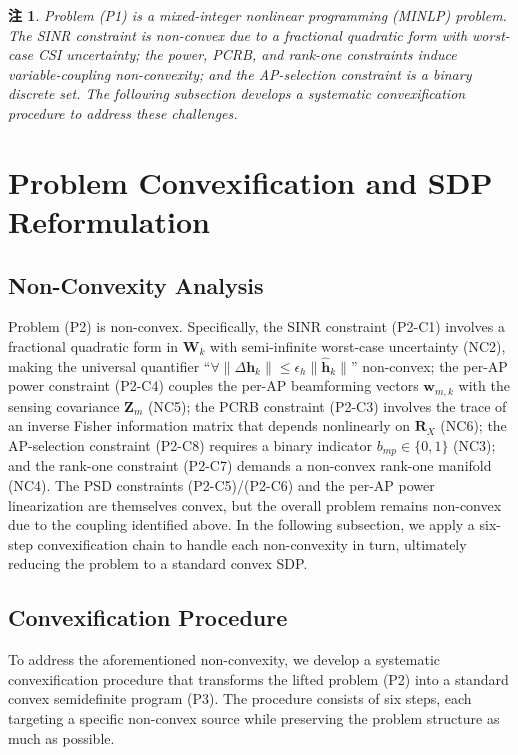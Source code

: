 \documentclass[12pt,a4paper]{article}
\newtheorem{remark}{注}
\newcommand{\vect}[1]{\mathbf{#1}}
\newcommand{\mat}[1]{\mathbf{#1}}
\begin{document}
\begin{remark}
Problem (P1) is a mixed-integer nonlinear programming (MINLP) problem. The SINR constraint is non-convex due to a fractional quadratic form with worst-case CSI uncertainty; the power, PCRB, and rank-one constraints induce variable-coupling non-convexity; and the AP-selection constraint is a binary discrete set. The following subsection develops a systematic convexification procedure to address these challenges.
\end{remark}
\section{Problem Convexification and SDP Reformulation}

\subsection{Non-Convexity Analysis}

Problem (P2) is non-convex. Specifically, the SINR constraint (P2-C1) involves a fractional quadratic form in $\mat{W}_k$ with semi-infinite worst-case uncertainty (NC2), making the universal quantifier ``$\forall \|\Delta\vect{h}_k\| \leq \epsilon_h \|\hat{\vect{h}}_k\|$'' non-convex; the per-AP power constraint (P2-C4) couples the per-AP beamforming vectors $\vect{w}_{m,k}$ with the sensing covariance $\mat{Z}_m$ (NC5); the PCRB constraint (P2-C3) involves the trace of an inverse Fisher information matrix that depends nonlinearly on $\mat{R}_X$ (NC6); the AP-selection constraint (P2-C8) requires a binary indicator $b_{mp} \in \{0,1\}$ (NC3); and the rank-one constraint (P2-C7) demands a non-convex rank-one manifold (NC4). The PSD constraints (P2-C5)/(P2-C6) and the per-AP power linearization are themselves convex, but the overall problem remains non-convex due to the coupling identified above. In the following subsection, we apply a six-step convexification chain to handle each non-convexity in turn, ultimately reducing the problem to a standard convex SDP.

\subsection{Convexification Procedure}

To address the aforementioned non-convexity, we develop a systematic convexification procedure that transforms the lifted problem (P2) into a standard convex semidefinite program (P3). The procedure consists of six steps, each targeting a specific non-convex source while preserving the problem structure as much as possible.
\end{document}
